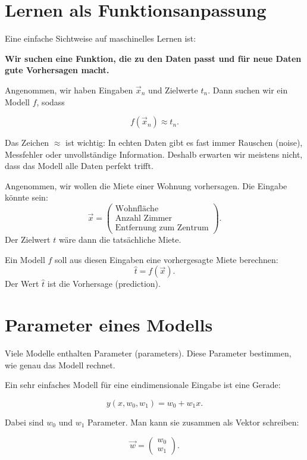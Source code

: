 \section{Lernen als Funktionsanpassung}

Eine einfache Sichtweise auf maschinelles Lernen ist:

\begin{center}
\textbf{Wir suchen eine Funktion, die zu den Daten passt und für neue Daten gute Vorhersagen macht.}
\end{center}

Angenommen, wir haben Eingaben \(\vec{x}_n\) und Zielwerte \(t_n\).
Dann suchen wir ein Modell \(f\), sodass

\[
    f(\vec{x}_n) \approx t_n.
\]

Das Zeichen \(\approx\) ist wichtig:
In echten Daten gibt es fast immer Rauschen (noise), Messfehler oder unvollständige Information.
Deshalb erwarten wir meistens nicht, dass das Modell alle Daten perfekt trifft.

\begin{examplebox}
Angenommen, wir wollen die Miete einer Wohnung vorhersagen.
Die Eingabe könnte sein:
\[
    \vec{x}
    =
    \begin{pmatrix}
        \text{Wohnfläche} \\
        \text{Anzahl Zimmer} \\
        \text{Entfernung zum Zentrum}
    \end{pmatrix}.
\]
Der Zielwert \(t\) wäre dann die tatsächliche Miete.

Ein Modell \(f\) soll aus diesen Eingaben eine vorhergesagte Miete berechnen:
\[
    \hat{t} = f(\vec{x}).
\]
Der Wert \(\hat{t}\) ist die Vorhersage (prediction).
\end{examplebox}

\section{Parameter eines Modells}

Viele Modelle enthalten Parameter (parameters).
Diese Parameter bestimmen, wie genau das Modell rechnet.

Ein sehr einfaches Modell für eine eindimensionale Eingabe ist eine Gerade:

\[
    y(x,w_0,w_1) = w_0 + w_1x.
\]

Dabei sind \(w_0\) und \(w_1\) Parameter.
Man kann sie zusammen als Vektor schreiben:

\[
    \vec{w}
    =
    \begin{pmatrix}
        w_0 \\
        w_1
    \end{pmatrix}.
\]

